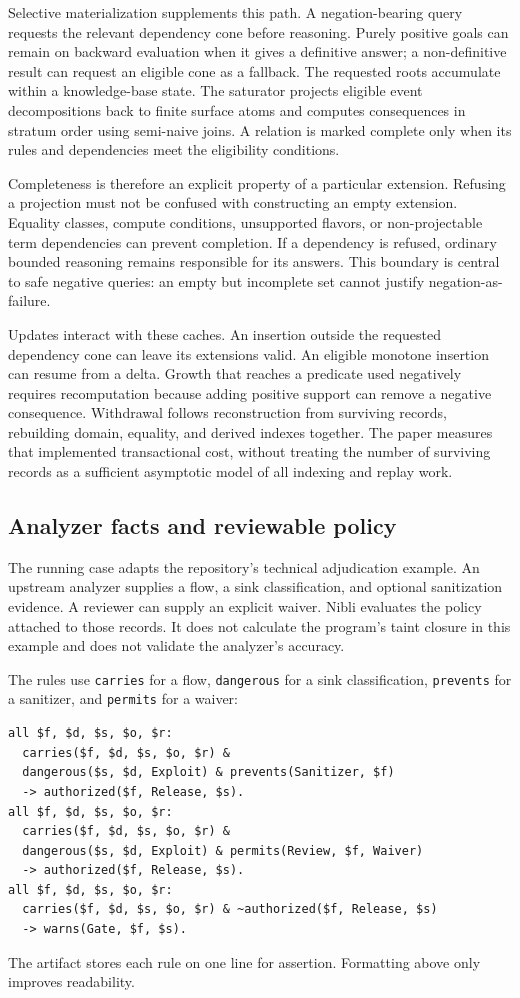 Selective materialization supplements this path. A negation-bearing query
requests the relevant dependency cone before reasoning. Purely positive goals
can remain on backward evaluation when it gives a definitive answer; a
non-definitive result can request an eligible cone as a fallback. The requested
roots accumulate within a knowledge-base state. The saturator projects eligible
event decompositions back to finite surface atoms and computes consequences
in stratum order using semi-naive joins. A relation is marked complete only
when its rules and dependencies meet the eligibility conditions.

Completeness is therefore an explicit property of a particular extension.
Refusing a projection must not be confused with constructing an empty extension.
Equality classes, compute conditions, unsupported flavors, or non-projectable
term dependencies can prevent completion. If a dependency is refused, ordinary
bounded reasoning remains responsible for its answers. This boundary is central
to safe negative queries: an empty but incomplete set cannot justify
negation-as-failure.

Updates interact with these caches. An insertion outside the requested dependency
cone can leave its extensions valid. An eligible monotone insertion can resume
from a delta. Growth that reaches a predicate used negatively requires
recomputation because adding positive support can remove a negative consequence.
Withdrawal follows reconstruction from surviving records, rebuilding domain,
equality, and derived indexes together. The paper measures that implemented
transactional cost, without treating the number of surviving records as a
sufficient asymptotic model of all indexing and replay work.

\subsection{Analyzer facts and reviewable policy}

The running case adapts the repository's technical adjudication example.
An upstream analyzer supplies a flow, a sink classification, and optional
sanitization evidence. A reviewer can supply an explicit waiver. Nibli evaluates
the policy attached to those records. It does not calculate the program's taint
closure in this example and does not validate the analyzer's accuracy.

The rules use \texttt{carries} for a flow, \texttt{dangerous} for a sink
classification, \texttt{prevents} for a sanitizer, and \texttt{permits} for a waiver:
\begin{lstlisting}[style=kr]
all $f, $d, $s, $o, $r:
  carries($f, $d, $s, $o, $r) &
  dangerous($s, $d, Exploit) & prevents(Sanitizer, $f)
  -> authorized($f, Release, $s).
all $f, $d, $s, $o, $r:
  carries($f, $d, $s, $o, $r) &
  dangerous($s, $d, Exploit) & permits(Review, $f, Waiver)
  -> authorized($f, Release, $s).
all $f, $d, $s, $o, $r:
  carries($f, $d, $s, $o, $r) & ~authorized($f, Release, $s)
  -> warns(Gate, $f, $s).
\end{lstlisting}
The artifact stores each rule on one line for assertion. Formatting above
only improves readability.

